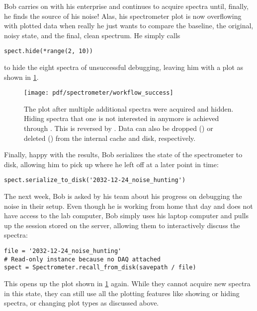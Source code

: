 Bob carries on with his enterprise and continues to acquire spectra until, finally, he finds the source of his noise!
Alas, his spectrometer plot is now overflowing with plotted data when really he just wants to compare the baseline, the original, noisy state, and the final, clean spectrum.
He simply calls
\begin{verbatim}
spect.hide(*range(2, 10))
\end{verbatim}
to hide the eight spectra of unsuccessful debugging, leaving him with a plot as shown in \cref{fig:speck:software:workflow:success}.

\begin{figure}
    \centering
    \texttt{[image: pdf/spectrometer/workflow\_success]}
    \caption{
        The \pyspeck plot after multiple additional spectra were acquired and hidden.
        Hiding spectra that one is not interested in anymore is achieved through .
        This is reversed by .
        Data can also be dropped () or deleted () from the internal cache and disk, respectively.
    }
    \label{fig:speck:software:workflow:success}
\end{figure}

Finally, happy with the results, Bob serializes the state of the spectrometer to disk, allowing him to pick up where he left off at a later point in time:
\begin{verbatim}
spect.serialize_to_disk('2032-12-24_noise_hunting')
\end{verbatim}
The next week, Bob is asked by his team about his progress on debugging the noise in their setup.
Even though he is working from home that day and does not have access to the lab computer, Bob simply uses his laptop computer and pulls up the  session stored on the server, allowing them to interactively discuss the spectra:
\begin{verbatim}
file = '2032-12-24_noise_hunting'
# Read-only instance because no DAQ attached
spect = Spectrometer.recall_from_disk(savepath / file)
\end{verbatim}
This opens up the plot shown in \cref{fig:speck:software:workflow:success} again.
While they cannot acquire new spectra in this state,
they can still use all the plotting features like showing or hiding spectra, or changing plot types as discussed above.

